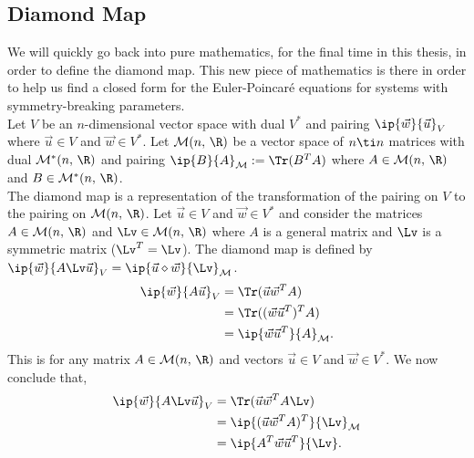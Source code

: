 \subsection{Diamond Map}
We will quickly go back into pure mathematics, for the final time in this thesis, in order to define the diamond map. This new piece of mathematics is there in order to help us find a closed form for the Euler-Poincar\'e equations for systems with symmetry-breaking parameters.\\

\noindent
Let $V$ be an $n$-dimensional vector space with dual $V^*$ and pairing $\ip{\vec w}{\vec u}_V$ where $\vec u \in V$ and $\vec w \in V^*$. Let $\mathcal{M}(n,\,\R)$ be a vector space of $n \ti n$ matrices with dual $\mathcal{M}^*(n,\,\R)$ and pairing $\ip{B}{A}_{\mathcal{M}} := \Tr(B^T A)$
where $A \in \mathcal{M}(n,\,\R)$ and $B \in \mathcal{M}^*(n,\,\R)$.\\

\noindent
The diamond map is a representation of the transformation of the pairing on $V$ to the pairing on $\mathcal{M}(n,\,\R)$. Let $\vec u \in V$ and $\vec w \in V^*$ and consider the matrices $A \in \mathcal{M}(n,\,\R)$ and $\Lv \in \mathcal{M}(n,\,\R)$ where $A$ is a general matrix and $\Lv$ is a symmetric matrix ($\Lv^T = \Lv$). The diamond map is defined by $\ip{\vec w}{A\Lv\vec u}_V = \ip{\vec u \diamond \vec w}{\Lv}_{\mathcal{M}}$.
\begin{align*}
  \ip{\vec w}{A\vec u}_V &= \Tr(\vec u \vec w^T A) \\
  &= \Tr((\vec w \vec u ^T)^T A)\\
  &= \ip{\vec w\vec u^T}{A}_{\mathcal{M}}.
\end{align*}
This is for any matrix $A \in \mathcal{M}(n,\,\R)$ and vectors $\vec u \in V$ and $\vec w \in V^*$. We now conclude that,
\begin{align*}
  \ip{\vec w}{A\Lv \vec u}_V &= \Tr(\vec u \vec w^T A\Lv) \\
  &= \ip{(\vec u\vec w^T A)^T}{\Lv}_{\mathcal{M}}\\
  &= \ip{A^T\vec w\vec u^T}{\Lv}.
\end{align*}
